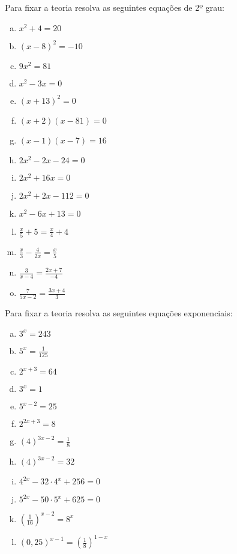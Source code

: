   Para fixar a teoria resolva as seguintes equações de 2º grau:
 \begin{multicols}{2}
  \begin{enumerate}[a)]
   \item $x^2 + 4= 20$
   \item $(x - 8)^2= -10$
   \item $9x^2= 81$
   \item $x^2 - 3x= 0$
   \item $(x + 13)^2= 0$
   \item $(x + 2)(x - 81)= 0$
   \item $(x-1)(x-7)= 16$
   \item $2x^2-2x-24= 0$
   \item $2x^2+16x= 0$
   \item $2x^2+2x-112= 0$
   \item $x^2-6x+13= 0$
   \item $\frac{x}{5}+ 5= \frac{x}{4} + 4$
   \item $\frac{x}{3} - \frac{4}{2x}= \frac{x}{5}$
   \item $\frac{3}{x-4}= \frac{2x+7}{-4}$
   \item $\frac{7}{5x-2}= \frac{3x+4}{3}$
 \end{enumerate}
 \end{multicols}

 Para fixar a teoria resolva as seguintes equações exponenciais:
 \begin{multicols}{2}
  \begin{enumerate}[a)]
   \item $3^x= 243$
   \item $5^x= \frac{1}{125}$
   \item $2^{x+3}= 64$
   \item $3^x= 1$
   \item $5^{x-2}= 25$
   \item $2^{2x+3}= 8$
   \item $(4)^{3x-2}= \frac{1}{8}$
   \item $(4)^{3x-2}= 32$
   \item $4^{2x} - 32\cdot 4^x + 256 = 0$
   \item $5^{2x} - 50 \cdot 5^x + 625=0$
   \item $\left(\frac{1}{16} \right)^{x-2}= 8^x$
   \item $(0,25)^{x-1}= \left(\frac{1}{8} \right)^{1-x}$
  \end{enumerate}
  \end{multicols}

\newpage
